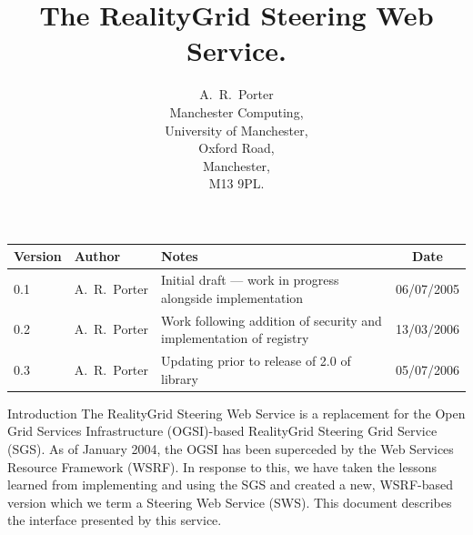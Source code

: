 \documentclass[a4paper]{article}
\begin{document}
\title{The RealityGrid Steering Web Service.}

\author{A.~R.~Porter \\
Manchester Computing,\\University of Manchester,\\Oxford Road,\\
Manchester,\\M13 9PL.}


\maketitle

\begin{table}
\begin{center}
\begin{tabular}{l|l|p{5cm}|c}
\hline\hline
Version & Author & Notes & Date \\
\hline
0.1 & A.~R.~Porter & Initial draft --- work in progress alongside implementation & 06/07/2005\\
0.2 & A.~R.~Porter & Work following addition of security and implementation of registry & 13/03/2006\\
0.3 & A.~R.~Porter & Updating prior to release of 2.0 of library & 05/07/2006\\
\hline\hline
\end{tabular}
\end{center}
\end{table}

\pagebreak

\tableofcontents

\pagebreak

\begin{section}{Introduction}
The RealityGrid Steering Web Service is a replacement for the Open
Grid Services Infrastructure (OGSI)-based RealityGrid Steering Grid
Service (SGS).  As of January 2004, the OGSI has been superceded by
the Web Services Resource Framework (WSRF).  In response to this, we
have taken the lessons learned from implementing and using the SGS and
created a new, WSRF-based version which we term a Steering Web Service
(SWS).  This document describes the interface presented by this
service.
\end{section}

\end{document}
